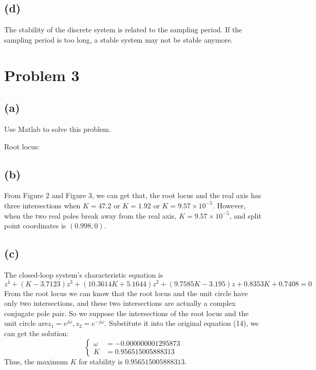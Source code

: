 ﻿\documentclass{myart}
\begin{document}
\subsection{(d)}
The stability of the discrete system is related to the sampling period. If the sampling period is too long, a stable system may not be stable anymore.

\section{Problem 3}
\subsection{(a)}
Use Matlab to solve this problem.

\qquad Root locus:

\newpage
\subsection{(b)}
From Figure 2 and Figure 3, we can get that, the root locus and the real axis has three intersections when $K=47.2$ or $K=1.92$ or $K=9.57\times 10^{-5}$. However, when the two real poles break away from the real axis, $K=9.57\times 10^{-5}$, and split point coordinates is $(0.998,0)$.

\subsection{(c)}
The closed-loop system's characteristic equation is
\begin{equation}
z^4+(K-3.7123)z^3+(10.3614K+5.1644)z^2+(9.7585K-3.195)z+0.8353K+0.7408=0
\end{equation}
\qquad From the root locus we can know that the root locus and the unit circle have only two intersections, and these two intersections are actually a complex conjugate pole pair. So we suppose the intersections of the root locus and the unit circle are$ z_1=e^{j\omega},z_2=e^{-j\omega} $. Substitute it into the original equation (14), we can get the solution:
\begin{equation}
\left.
\begin{cases}
\omega &=-0.000000001295873\\
K &=0.956515005888313
\end{cases}
\right.
\end{equation}
\qquad Thus, the maximum $K$ for stability is $0.956515005888313$.
\end{document}
